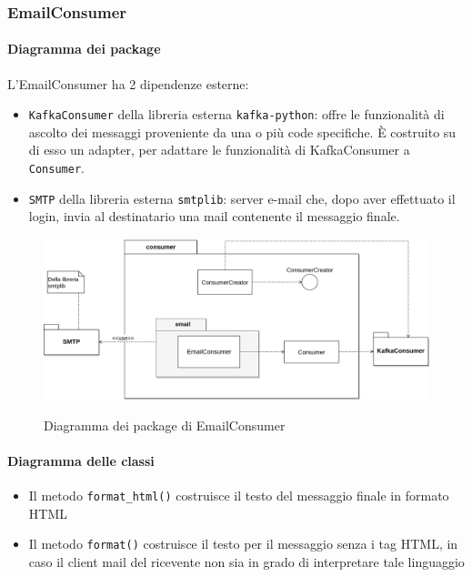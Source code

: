 \subsubsection{EmailConsumer}

\paragraph{Diagramma dei package}

L'EmailConsumer ha 2 dipendenze esterne:
\begin{itemize}
    \item \texttt{KafkaConsumer} della libreria esterna \texttt{kafka-python}: offre le funzionalità di ascolto dei messaggi
        proveniente da una o più code specifiche. È costruito su di esso un adapter, per adattare le funzionalità di KafkaConsumer a
        \texttt{Consumer}.
    \item \texttt{SMTP} della libreria esterna \texttt{smtplib}: server e-mail che, dopo aver effettuato il login,
        invia al destinatario una mail contenente il messaggio finale.
\end{itemize}

\begin{figure}[H]
    \centering
    \includegraphics[width=\textwidth]{img/Package-EmailConsumer.png}\\
    \caption{Diagramma dei package di EmailConsumer}
\end{figure}


\paragraph{Diagramma delle classi}

\begin{itemize}
    \item Il metodo \texttt{format\_html()} costruisce il testo del messaggio finale in formato HTML
    \item Il metodo \texttt{format()} costruisce il testo per il messaggio senza i tag HTML, in caso il client mail del ricevente non sia in grado
        di interpretare tale linguaggio
\end{itemize}

